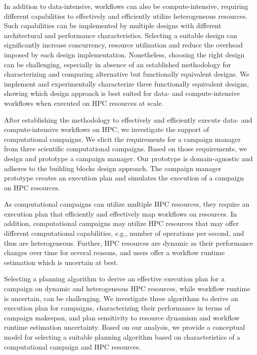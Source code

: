 In addition to data-intensive, workflows can also be compute-intensive,
requiring different capabilities to effectively and efficiently utilize
heterogeneous resources. Such capabilities can be implemented by multiple
designs with different architectural and performance characteristics. Selecting
a suitable design can significantly increase concurrency, resource utilization and reduce the
overhead imposed by each design implementation. Nonetheless, choosing the right
design can be challenging, especially in absence of an established methodology
for characterizing and comparing alternative but functionally equivalent
designs. We implement and experimentally characterize three functionally
equivalent designs, showing which design approach is best suited for data- and
compute-intensive workflows when executed on HPC resources at scale.

After establishing the methodology to effectively and efficiently execute data-
and compute-intensive workflows on HPC, we investigate the support of
computational campaigns. We elicit the requirements for a campaign manager from
three scientific computational campaigns. Based on those requirements, we design
and prototype a campaign manager. Our prototype is domain-agnostic and adheres
to the building blocks design approach. The campaign manager prototype creates
an execution plan and simulates the execution of a campaign on HPC resources.

As computational campaigns can utilize multiple HPC resources, they require an
execution plan that efficiently and effectively map workflows on resources. In
addition, computational campaigns may utilize HPC resources that may offer
different computational capabilities, e.g., number of operations per second,
and thus are heterogeneous. Further, HPC resources are dynamic as their
performance changes over time for several reasons, and users offer a workflow
runtime estimation which is uncertain at best.

Selecting a planning algorithm to derive an effective execution plan for a
campaign on dynamic and heterogeneous HPC resources, while workflow runtime is
uncertain, can be challenging. We investigate three algorithms to derive an
execution plan for campaigns, characterizing their performance in terms of
campaign makespan, and plan sensitivity to resource dynamism and workflow
runtime estimation uncertainty. Based on our analysis, we provide a conceptual
model for selecting a suitable planning algorithm based on characteristics of a
computational campaign and HPC resources.

